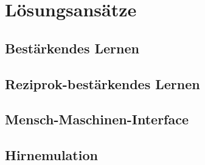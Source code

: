 \chapter{Lösungsansätze}
\section{Bestärkendes Lernen}
\section{Reziprok-bestärkendes Lernen}
\section{Mensch-Maschinen-Interface}
\section{Hirnemulation}


